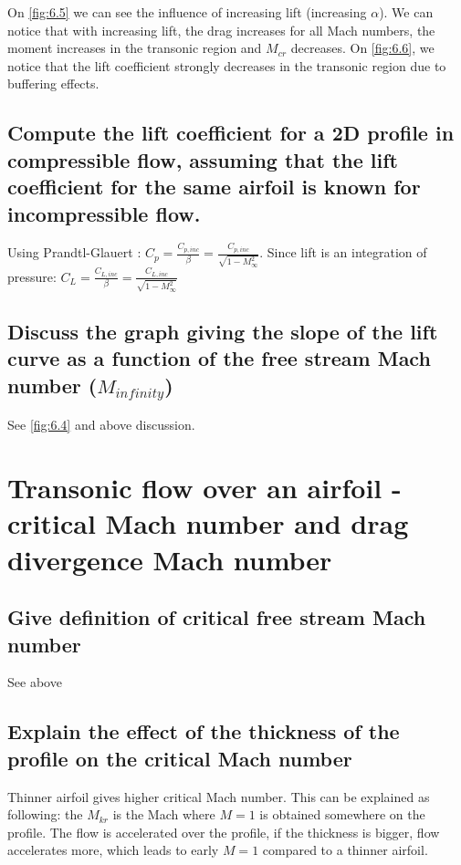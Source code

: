 \documentclass[british,french,11pt, a4paper, openany]{article}
\begin{document}
On \autoref{fig:6.5} we can see the influence of increasing lift (increasing $\alpha$). We can notice that with increasing lift, the drag increases for all Mach numbers, the moment increases in the transonic region and $M_{cr}$ decreases. On \autoref{fig:6.6}, we notice that the lift coefficient strongly decreases in the transonic region due to buffering effects. 


\subsection{Compute the lift coefficient for a 2D profile in compressible flow, assuming that the lift coefficient for the same airfoil is known for incompressible flow.}
Using Prandtl-Glauert : $C_p = \frac{C_{p,inc}}{\beta} = \frac{C_{p,inc}}{\sqrt{1 - M_\infty ^2}}$. Since lift is an integration of pressure: $C_L = \frac{C_{L,inc}}{\beta} = \frac{C_{L,inc}}{\sqrt{1 - M_\infty ^2}}$


\subsection{Discuss the graph giving the slope of the lift curve as a function of the free stream Mach number ($M_{infinity}$)}

See \autoref{fig:6.4} and above discussion.



\section{Transonic flow over an airfoil - critical Mach number and drag divergence Mach	number}
\subsection{Give definition of critical free stream Mach number}
See above

\subsection{Explain the effect of the thickness of the profile on the critical Mach number}
Thinner airfoil gives higher critical Mach number. This can be explained as following: the $M_{kr}$ is the Mach where $M=1$ is obtained somewhere on the profile. The flow is accelerated over the profile, if the thickness is bigger, flow accelerates more, which leads to early $M=1$ compared to a thinner airfoil.
\end{document}
